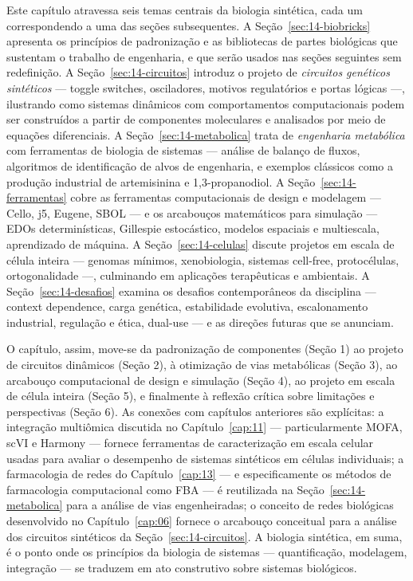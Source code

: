 Este capítulo atravessa seis temas centrais da biologia sintética, cada um correspondendo a uma das seções subsequentes. A Seção~\ref{sec:14-biobricks} apresenta os princípios de padronização e as bibliotecas de partes biológicas que sustentam o trabalho de engenharia, e que serão usados nas seções seguintes sem redefinição. A Seção~\ref{sec:14-circuitos} introduz o projeto de \emph{circuitos genéticos sintéticos} --- toggle switches, osciladores, motivos regulatórios e portas lógicas ---, ilustrando como sistemas dinâmicos com comportamentos computacionais podem ser construídos a partir de componentes moleculares e analisados por meio de equações diferenciais. A Seção~\ref{sec:14-metabolica} trata de \emph{engenharia metabólica} com ferramentas de biologia de sistemas --- análise de balanço de fluxos, algoritmos de identificação de alvos de engenharia, e exemplos clássicos como a produção industrial de artemisinina e 1,3-propanodiol. A Seção~\ref{sec:14-ferramentas} cobre as ferramentas computacionais de design e modelagem --- Cello, j5, Eugene, SBOL --- e os arcabouços matemáticos para simulação --- EDOs determinísticas, Gillespie estocástico, modelos espaciais e multiescala, aprendizado de máquina. A Seção~\ref{sec:14-celulas} discute projetos em escala de célula inteira --- genomas mínimos, xenobiologia, sistemas cell-free, protocélulas, ortogonalidade ---, culminando em aplicações terapêuticas e ambientais. A Seção~\ref{sec:14-desafios} examina os desafios contemporâneos da disciplina --- context dependence, carga genética, estabilidade evolutiva, escalonamento industrial, regulação e ética, dual-use --- e as direções futuras que se anunciam.

O capítulo, assim, move-se da padronização de componentes (Seção 1) ao projeto de circuitos dinâmicos (Seção 2), à otimização de vias metabólicas (Seção 3), ao arcabouço computacional de design e simulação (Seção 4), ao projeto em escala de célula inteira (Seção 5), e finalmente à reflexão crítica sobre limitações e perspectivas (Seção 6). As conexões com capítulos anteriores são explícitas: a integração multiômica discutida no Capítulo~\ref{cap:11} --- particularmente MOFA, scVI e Harmony --- fornece ferramentas de caracterização em escala celular usadas para avaliar o desempenho de sistemas sintéticos em células individuais; a farmacologia de redes do Capítulo~\ref{cap:13} --- e especificamente os métodos de farmacologia computacional como FBA --- é reutilizada na Seção~\ref{sec:14-metabolica} para a análise de vias engenheiradas; o conceito de redes biológicas desenvolvido no Capítulo~\ref{cap:06} fornece o arcabouço conceitual para a análise dos circuitos sintéticos da Seção~\ref{sec:14-circuitos}. A biologia sintética, em suma, é o ponto onde os princípios da biologia de sistemas --- quantificação, modelagem, integração --- se traduzem em ato construtivo sobre sistemas biológicos.

